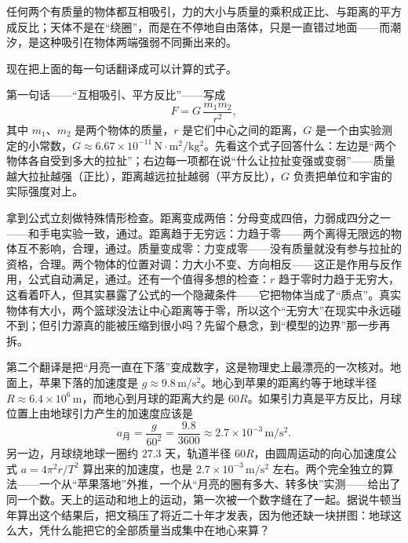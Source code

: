 
\begin{oneline}
任何两个有质量的物体都互相吸引，力的大小与质量的乘积成正比、与距离的平方成反比；天体不是在“绕圈”，而是在不停地自由落体，只是一直错过地面——而潮汐，是这种吸引在物体两端强弱不同撕出来的。
\end{oneline}


现在把上面的每一句话翻译成可以计算的式子。

第一句话——“互相吸引、平方反比”——写成
\[
F = G\,\frac{m_{1} m_{2}}{r^{2}},
\]
其中 \(m_{1}\)、\(m_{2}\) 是两个物体的质量，\(r\) 是它们中心之间的距离，\(G\) 是一个由实验测定的小常数，\(G \approx 6.67\times 10^{-11}\,\mathrm{N\cdot m^{2}/kg^{2}}\)。先看这个式子回答什么：左边是“两个物体各自受到多大的拉扯”；右边每一项都在说“什么让拉扯变强或变弱”——质量越大拉扯越强（正比），距离越远拉扯越弱（平方反比），\(G\) 负责把单位和宇宙的实际强度对上。

拿到公式立刻做特殊情形检查。距离变成两倍：分母变成四倍，力弱成四分之一——和手电实验一致，通过。距离趋于无穷远：力趋于零——两个离得无限远的物体互不影响，合理，通过。质量变成零：力变成零——没有质量就没有参与拉扯的资格，合理。两个物体的位置对调：力大小不变、方向相反——这正是作用与反作用，公式自动满足，通过。还有一个值得多想的检查：\(r\) 趋于零时力趋于无穷大，这看着吓人，但其实暴露了公式的一个隐藏条件——它把物体当成了“质点”。真实物体有大小，两个篮球没法让中心距离等于零，所以这个“无穷大”在现实中永远碰不到；但引力源真的能被压缩到很小吗？先留个悬念，到“模型的边界”那一步再拆。

第二个翻译是把“月亮一直在下落”变成数字，这是物理史上最漂亮的一次核对。地面上，苹果下落的加速度是 \(g \approx 9.8\,\mathrm{m/s^{2}}\)。地心到苹果的距离约等于地球半径 \(R \approx 6.4\times10^{6}\,\mathrm{m}\)，而地心到月球的距离大约是 \(60 R\)。如果引力真是平方反比，月球位置上由地球引力产生的加速度应该是
\[
a_{\text{月}} = \frac{g}{60^{2}} = \frac{9.8}{3600} \approx 2.7\times10^{-3}\,\mathrm{m/s^{2}}.
\]
另一边，月球绕地球一圈约 \(27.3\) 天，轨道半径 \(60R\)，由圆周运动的向心加速度公式 \(a = 4\pi^{2}r/T^{2}\) 算出来的加速度，也是 \(2.7\times10^{-3}\,\mathrm{m/s^{2}}\) 左右。两个完全独立的算法——一个从“苹果落地”外推，一个从“月亮的圈有多大、转多快”实测——给出了同一个数。天上的运动和地上的运动，第一次被一个数字缝在了一起。据说牛顿当年算出这个结果后，把文稿压了将近二十年才发表，因为他还缺一块拼图：地球这么大，凭什么能把它的全部质量当成集中在地心来算？

